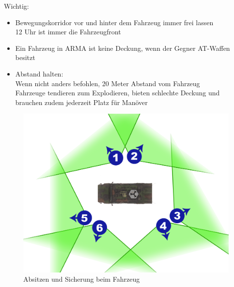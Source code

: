 Wichtig:
\begin{itemize}
	\item Bewegungskorridor vor und hinter dem Fahrzeug immer frei lassen\\ 12 Uhr ist immer die Fahrzeugfront
	\item Ein Fahrzeug in ARMA ist keine Deckung, wenn der Gegner AT-Waffen besitzt
	\item Abstand halten:\\ Wenn nicht anders befohlen, 20 Meter Abstand vom Fahrzeug\\ Fahrzeuge tendieren zum Explodieren, bieten schlechte Deckung und brauchen zudem jederzeit Platz für Manöver
\end{itemize}
\begin{figure}[htbp]
	\centering
	\includegraphics[width=15cm]{../img/basic/fahrzeug/fahrzeug_verlassen}
	\caption{Absitzen und Sicherung beim Fahrzeug}
\end{figure}

